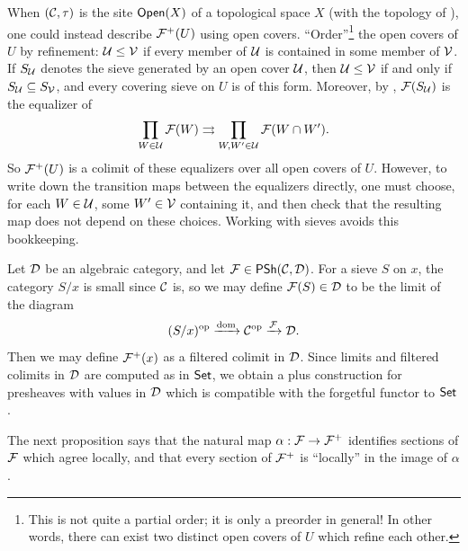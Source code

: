 \begin{remark}\label{remark:chap:sheaves:sec:sites:plus construction for open covers}
    When $(\catC,\tau)$ is the site $\Open(X)$ of a topological space $X$ (with the topology of ), one could instead describe $\cal{F}^+(U)$ using open covers. ``Order''\footnote{This is not quite a partial order; it is only a preorder in general! In other words, there can exist two distinct open covers of $U$ which refine each other.} the open covers of $U$ by refinement: $\cal{U} \leq \cal{V}$ if every member of $\cal{U}$ is contained in some member of $\cal{V}$. If $S_{\cal{U}}$ denotes the sieve generated by an open cover $\cal{U}$, then $\cal{U} \leq \cal{V}$ if and only if $S_{\cal{U}} \subseteq S_{\cal{V}}$, and every covering sieve on $U$ is of this form. Moreover, by , $\cal{F}(S_{\cal{U}})$ is the equalizer of
    \[\prod_{W \in \cal{U}} \cal{F}(W) \rightrightarrows \prod_{W,W' \in \cal{U}} \cal{F}(W \cap W').\]
    So $\cal{F}^+(U)$ is a colimit of these equalizers over all open covers of $U$. However, to write down the transition maps between the equalizers directly, one must choose, for each $W \in \cal{U}$, some $W' \in \cal{V}$ containing it, and then check that the resulting map does not depend on these choices. Working with sieves avoids this bookkeeping.
\end{remark}

\begin{remark}\label{remark:chap:sheaves:sec:sites:plus construction in algebraic categories}
    Let $\catD$ be an algebraic category, and let $\cal{F} \in \PSh(\catC,\catD)$. For a sieve $S$ on $x$, the category $S/x$ is small since $\catC$ is, so we may define $\cal{F}(S) \in \catD$ to be the limit of the diagram
    \[(S/x)^\op \xrightarrow{\dom} \catC^\op \xrightarrow{\cal{F}} \catD.\]
    Then we may define $\cal{F}^+(x)$ as a filtered colimit in $\catD$. Since limits and filtered colimits in $\catD$ are computed as in $\Set$, we obtain a plus construction for presheaves with values in $\catD$ which is compatible with the forgetful functor to $\Set$.
\end{remark}

\startlecture[Oct 8, 2026]

The next proposition says that the natural map $\alpha : \cal{F} \to \cal{F}^+$ identifies sections of $\cal{F}$ which agree locally, and that every section of $\cal{F}^+$ is ``locally'' in the image of $\alpha$.


